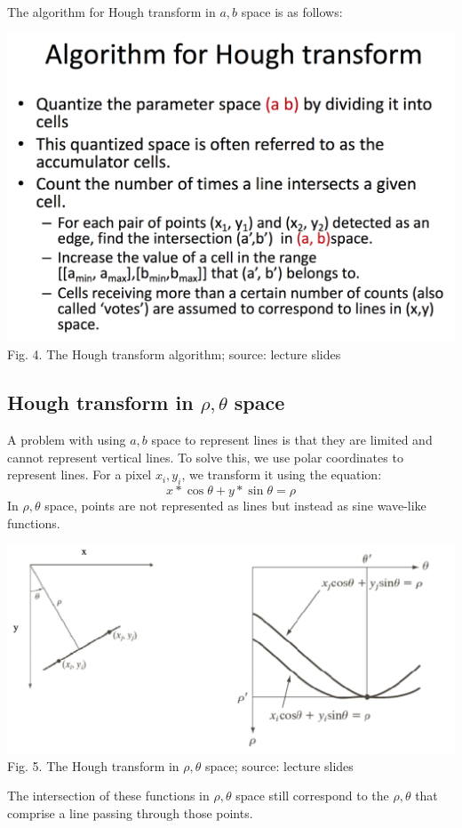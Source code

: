 \documentclass{article}
\begin{document}
The algorithm for Hough transform in $a,b$ space is as follows:

\includegraphics[width=\textwidth]{hough_transform3.png}
Fig. 4. The Hough transform algorithm; source: lecture slides

\subsection{Hough transform in $\rho, \theta$ space}
A problem with using $a,b$ space to represent lines is that they are limited and cannot represent vertical lines.
To solve this, we use polar coordinates to represent lines. For a pixel $x_i, y_i$, we transform it using the equation:
$$ x*\cos\theta + y*\sin\theta = \rho$$
In $\rho, \theta$ space, points are not represented as lines but instead as sine wave-like functions.

\includegraphics[width=\textwidth]{hough_transform4.png}
Fig. 5. The Hough transform in $\rho, \theta$ space; source: lecture slides

The intersection of these functions in $\rho, \theta$ space still correspond to the $\rho, \theta$ that comprise a line passing through those points.
\end{document}
